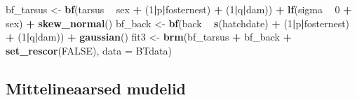 \documentclass[]{book}
\newenvironment{Shaded}{\begin{snugshade}}{\end{snugshade}}
\newcommand{\DataTypeTok}[1]{\textcolor[rgb]{0.13,0.29,0.53}{#1}}
\newcommand{\DecValTok}[1]{\textcolor[rgb]{0.00,0.00,0.81}{#1}}
\newcommand{\KeywordTok}[1]{\textcolor[rgb]{0.13,0.29,0.53}{\textbf{#1}}}
\newcommand{\NormalTok}[1]{#1}
\newcommand{\OperatorTok}[1]{\textcolor[rgb]{0.81,0.36,0.00}{\textbf{#1}}}
\newcommand{\OtherTok}[1]{\textcolor[rgb]{0.56,0.35,0.01}{#1}}
\newcommand{\StringTok}[1]{\textcolor[rgb]{0.31,0.60,0.02}{#1}}
\begin{document}
\begin{Shaded}
\begin{Highlighting}[]
\NormalTok{bf_tarsus <-}\StringTok{ }\KeywordTok{bf}\NormalTok{(tarsus }\OperatorTok{~}\StringTok{ }\NormalTok{sex }\OperatorTok{+}\StringTok{ }\NormalTok{(}\DecValTok{1}\OperatorTok{|}\NormalTok{p}\OperatorTok{|}\NormalTok{fosternest) }\OperatorTok{+}\StringTok{ }\NormalTok{(}\DecValTok{1}\OperatorTok{|}\NormalTok{q}\OperatorTok{|}\NormalTok{dam)) }\OperatorTok{+}
\StringTok{  }\KeywordTok{lf}\NormalTok{(sigma }\OperatorTok{~}\StringTok{ }\DecValTok{0} \OperatorTok{+}\StringTok{ }\NormalTok{sex) }\OperatorTok{+}\StringTok{ }\KeywordTok{skew_normal}\NormalTok{()}
\NormalTok{bf_back <-}\StringTok{ }\KeywordTok{bf}\NormalTok{(back }\OperatorTok{~}\StringTok{ }\KeywordTok{s}\NormalTok{(hatchdate) }\OperatorTok{+}\StringTok{ }\NormalTok{(}\DecValTok{1}\OperatorTok{|}\NormalTok{p}\OperatorTok{|}\NormalTok{fosternest) }\OperatorTok{+}\StringTok{ }\NormalTok{(}\DecValTok{1}\OperatorTok{|}\NormalTok{q}\OperatorTok{|}\NormalTok{dam)) }\OperatorTok{+}
\StringTok{  }\KeywordTok{gaussian}\NormalTok{()}
\NormalTok{fit3 <-}\StringTok{ }\KeywordTok{brm}\NormalTok{(bf_tarsus }\OperatorTok{+}\StringTok{ }\NormalTok{bf_back }\OperatorTok{+}\StringTok{ }\KeywordTok{set_rescor}\NormalTok{(}\OtherTok{FALSE}\NormalTok{), }\DataTypeTok{data =}\NormalTok{ BTdata)}
\end{Highlighting}
\end{Shaded}

\hypertarget{mittelineaarsed-mudelid}{%
\subsection{Mittelineaarsed mudelid}\label{mittelineaarsed-mudelid}}
\end{document}
